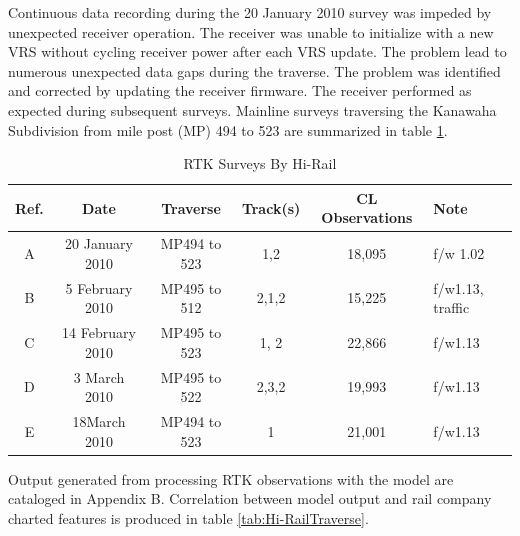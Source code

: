Continuous data recording during the 20 January 2010 survey was impeded by unexpected receiver operation. The receiver was unable to initialize with a new VRS without cycling receiver power after each VRS update. The problem lead to numerous unexpected data gaps during the traverse. The problem was identified and corrected by updating the receiver firmware. The receiver performed as expected during subsequent surveys. Mainline surveys traversing the Kanawaha Subdivision from mile post (MP) 494 to 523 are summarized in table \ref{tab:Hi-RailSurvey}.

\begin{table}[ht!]
	\begin{center}
	\caption{RTK Surveys By Hi-Rail}
	\label{tab:Hi-RailSurvey}
		\begin{tabular}{c c c c c l}
			\toprule
			Ref.&Date& Traverse&Track(s)&CL Observations&Note\\
			\midrule
	A & 20 January 2010   &MP494 to 523 & 1,2           & 18,095 &f/w 1.02\\
	B & 5 February 2010   &MP495 to 512 & 2,1,2        & 15,225 &f/w1.13, traffic \\
	C & 14 February 2010 &MP495 to 523 & 1, 2          & 22,866 &f/w1.13\\
	D & 3 March 2010       &MP495 to 522 & 2,3,2        & 19,993 &f/w1.13\\
	E & 18March 2010      &MP494 to 523  & 1             & 21,001 &f/w1.13\\
			\bottomrule
	\end{tabular}
	\end{center}
\end{table}

Output generated from processing RTK observations with the model are cataloged in Appendix B. Correlation between model output and rail company charted features is produced in table \ref{tab:Hi-RailTraverse}. 

